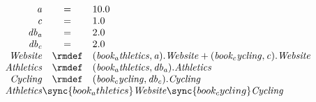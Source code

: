 \begin{displaymath}
	\begin{array}{rcl}
		\mathit{a} & = & 10.0\\
		\mathit{c} & = & 1.0\\
		\mathit{db_a} & = & 2.0\\
		\mathit{db_c} & = & 2.0\\
[0.0ex]		\mathit{Website} & \rmdef & (\mathit{book_athletics},\mathit{a}).\mathit{Website}+(\mathit{book_cycling},\mathit{c}).\mathit{Website}\\
		\mathit{Athletics} & \rmdef & (\mathit{book_athletics},\mathit{db_a}).\mathit{Athletics}\\
		\mathit{Cycling} & \rmdef & (\mathit{book_cycling},\mathit{db_c}).\mathit{Cycling}\\
[0.0ex]		\multicolumn{3}{l}{\mathit{Athletics}\sync{book_athletics}\mathit{Website}\sync{book_cycling}\mathit{Cycling}}\\
[0.0ex]	\end{array}
\end{displaymath}
